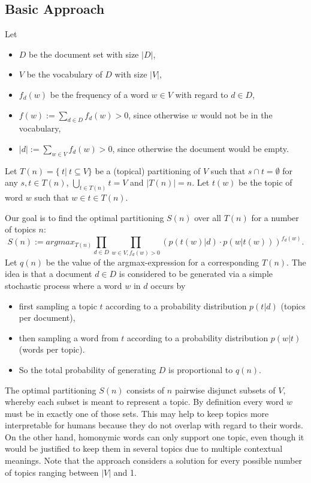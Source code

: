 \documentclass[10pt, a4paper, oneside]{article}
\begin{document}
\subsection{Basic Approach}
\label{basics}
Let
\begin{itemize}
\item $D$ be the document set with size $|D|$,
\item $V$ be the vocabulary of $D$ with size $|V|$,
\item $f_d(w)$ be the frequency of a word $w \in V$ with regard to $d \in D$,
\item $f(w) := \sum_{d \in D} f_d(w) > 0$, since otherwise $w$ would not be in the vocabulary,
\item $|d| := \sum_{w \in V} f_d(w) > 0$, since otherwise the document would be empty.
\end{itemize}
Let $T(n) = \{\ t |\ t \subseteq V\} $ be a (topical) partitioning of $V$ such that $s \cap t = \emptyset$ for any $s, t \in T(n)$, $\bigcup_{t \in T(n)} t = V$ and $|T(n)| = n$.
Let $t(w)$ be the topic of word $w$ such that $w \in t \in T(n)$.

Our goal is to find the optimal partitioning $S(n)$ over all $T(n)$ for a number of topics $n$:
\begin{equation}
\label{sn} 
S(n) := argmax_{T(n)} \prod_{d \in D} \prod_{w \in V, f_d(w) > 0} (p(t(w) | d) \cdot p(w | t(w)))^{f_d(w)}.
\end{equation}
Let $q(n)$ be the value of the argmax-expression for a corresponding $T(n)$.
The idea is that a document $d \in D$ is considered to be generated via a simple stochastic process where a word $w$ in $d$
occurs by
\begin{itemize}
\item first sampling a topic $t$ according to a probability distribution $p(t | d)$ (topics per document),
\item then sampling a word from $t$ according to a probability distribution $p(w | t)$ (words per topic).
\item So the total probability of generating $D$ is proportional to $q(n)$.
\end{itemize}
The optimal partitioning $S(n)$ consists of $n$ pairwise disjunct subsets of $V$, whereby each subset is meant to represent a topic.
By definition every word $w$ must be in exactly one of those sets. This may help to keep topics more interpretable for humans because they do not overlap with regard to their words. On the other hand, homonymic words can only support one topic, even though it would be justified to keep them in several topics due to multiple contextual meanings. Note that the approach considers a solution for every possible number of topics ranging between $|V|$ and 1.
\end{document}
